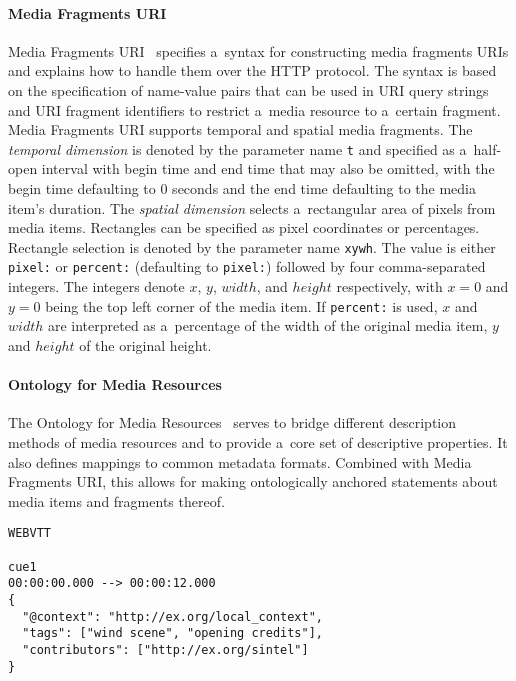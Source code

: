 \documentclass{sig-alternate}
\begin{document}
\paragraph{Media Fragments URI}

Media Fragments URI~\cite{troncy2012mediafragments}
specifies a~syntax for constructing media fragments URIs
and explains how to handle them over the HTTP protocol.
The syntax is based on the specification of
name-value pairs that can be used in URI query strings
and URI fragment identifiers to restrict a~media resource
to a~certain fragment.
Media Fragments URI supports temporal and spatial media fragments.
The \emph{temporal dimension} is denoted
by the parameter name \texttt{t} and specified
as a~half-open interval with begin time and end time
that may also be omitted,
with the begin time defaulting to 0 seconds
and the end time defaulting to the media item's duration.
The \emph{spatial dimension} selects
a~rectangular area of pixels from media items.
Rectangles can be specified as pixel coordinates or percentages.
Rectangle selection is denoted by the parameter name \texttt{xywh}.
The value is either \texttt{pixel:} or \texttt{percent:}
(defaulting to \texttt{pixel:})
followed by four comma-separated integers.
The integers denote $x$, $y$, $width$, and $height$ respectively,
with $x = 0$ and $y = 0$ being the top left corner of the media item.
If \texttt{percent:} is used, $x$ and $width$ are interpreted
as a~percentage of the width of the original media item,
$y$ and $height$
of the original height.

\paragraph{Ontology for Media Resources}

The Ontology for Media Resources~\cite{lee2012mediaontology}
serves to bridge different description methods of media resources
and to provide a~core set of descriptive properties.
It also defines mappings to common metadata formats.
Combined with Media Fragments URI,
this allows for making ontologically anchored statements
about media items and fragments thereof.

\begin{lstlisting}[caption={Sample WebVTT metadata file},
  label=listing:webvtt, float=t!]
WEBVTT

cue1
00:00:00.000 --> 00:00:12.000
{
  "@context": "http://ex.org/local_context",
  "tags": ["wind scene", "opening credits"],
  "contributors": ["http://ex.org/sintel"]
}
\end{lstlisting}
\end{document}
